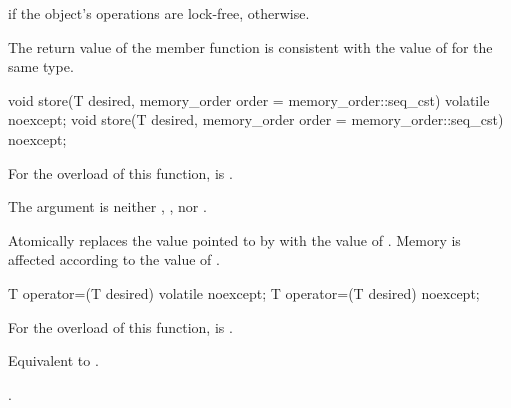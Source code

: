 \begin{itemdescr}
\pnum
\returns
{} if the object's operations are lock-free,  otherwise.
\begin{note}
The return value of the  member function
is consistent with the value of  for the same type.
\end{note}
\end{itemdescr}

%
%
%
%
%
%
\begin{itemdecl}
void store(T desired, memory_order order = memory_order::seq_cst) volatile noexcept;
void store(T desired, memory_order order = memory_order::seq_cst) noexcept;
\end{itemdecl}

\begin{itemdescr}
\pnum
\constraints
For the  overload of this function,
 is .

\pnum
\expects
The  argument is neither ,
, nor .

\pnum
\effects
Atomically replaces the value pointed to by 
with the value of . Memory is affected according to the value of
.
\end{itemdescr}

%
%
%
%
\begin{itemdecl}
T operator=(T desired) volatile noexcept;
T operator=(T desired) noexcept;
\end{itemdecl}

\begin{itemdescr}
\pnum
\constraints
For the  overload of this function,
 is .

\pnum
\effects
Equivalent to .

\pnum
\returns
{}.
\end{itemdescr}

